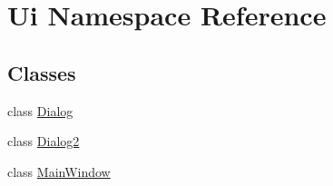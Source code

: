 \hypertarget{namespace_ui}{}\section{Ui Namespace Reference}
\label{namespace_ui}
\subsection*{Classes}
\begin{DoxyCompactItemize}
\item 
class \hyperlink{class_ui_1_1_dialog}{Dialog}
\item 
class \hyperlink{class_ui_1_1_dialog2}{Dialog2}
\item 
class \hyperlink{class_ui_1_1_main_window}{Main\+Window}
\end{DoxyCompactItemize}
